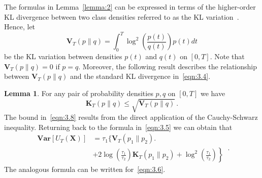 \documentclass[lettersize,journal,onecolumn]{IEEEtran}
\theoremstyle{definition}
\newtheorem{lemma}{Lemma}
\newcommand{\Var}[1]{\mathbf{Var}\left[#1\right]}
\begin{document}
The formulas in Lemma~\ref{lemma:2} can be expressed in terms of the higher-order KL 
divergence between two class densities referred to as the KL 
variation~\cite{ghosal2017fundamentals}. Hence, let
\begin{equation}
	\mathbf{V}_T \left(p \parallel q\right) =
	\int_{0}^{T} \log^2\left(\frac{p(t)}{q(t)}\right)p(t) dt
	\label{eqn:3.7}
\end{equation}
be the KL variation between densities $p(t)$ and $q(t)$ on $[0,T]$. Note that 
$\mathbf{V}_T \left(p \parallel q\right)=0$ if $p=q$. Moreover, the following result 
describes the relationship between $\mathbf{V}_T \left(p \parallel q\right)$ and the 
standard KL divergence in~\eqref{eqn:3.4}.
\begin{lemma}
	\label{lemma:3}
	For any pair of probability densities $p,q$ on $[0,T]$ we have
	\begin{equation}
		\mathbf{K}_T \left(p \parallel q\right) \leq
		\sqrt{\mathbf{V}_T \left(p \parallel q\right)}
		\label{eqn:3.8}\,.
	\end{equation}
	The bound in~\eqref{eqn:3.8} results from the direct application of the 
	Cauchy-Schwarz inequality. Returning back to the formula in~\eqref{eqn:3.5} we can 
	obtain that
	\begin{equation}
		\begin{split}
			\Var{U_{T}(\mathbf{X})} &=
			\tau_{1} \bigg\{
			\mathbf{V}_T \left(p_{1} \parallel p_{2}\right) 
			\bigg. \\
			& \left.
			+ 2\log\left(\frac{\tau_{1}}{\tau_{2}}\right)
			\mathbf{K}_T \left(p_{1} \parallel p_{2}\right) +
			\log^2\left(\frac{\tau_{1}}{\tau_{2}}\right)
			\right\}
		\end{split}
		\label{eqn:3.9}\,.
	\end{equation}
	The analogous formula can be written for~\eqref{eqn:3.6}.
\end{lemma}
\end{document}
